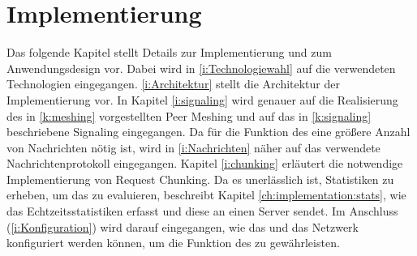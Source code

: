 \chapter{Implementierung}\label{implementierung}
Das folgende Kapitel stellt Details zur Implementierung und zum Anwendungsdesign vor. Dabei wird in \ref{i:Technologiewahl} auf die verwendeten Technologien eingegangen. \ref{i:Architektur} stellt die Architektur der Implementierung vor. In Kapitel \ref{i:signaling} wird genauer auf die Realisierung des in \ref{k:meshing} vorgestellten Peer Meshing und auf das in \ref{k:signaling} beschriebene Signaling eingegangen. Da für die Funktion des \cdns eine größere Anzahl von Nachrichten nötig ist, wird in \ref{i:Nachrichten} näher auf das verwendete Nachrichtenprotokoll eingegangen. Kapitel \ref{i:chunking} erläutert die notwendige Implementierung von Request Chunking. Da es unerlässlich ist, Statistiken zu erheben, um das \cdn zu evaluieren, beschreibt Kapitel \ref{ch:implementation:stats}, wie das \cdn Echtzeitsstatistiken erfasst und diese an einen Server sendet. Im Anschluss (\ref{i:Konfiguration}) wird darauf eingegangen, wie das \cdn und das Netzwerk konfiguriert werden können, um die Funktion des \cdns zu gewährleisten.  

